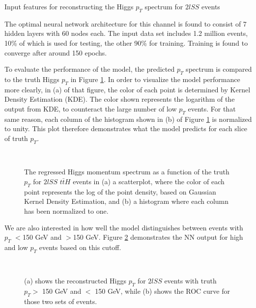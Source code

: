 \begin{table}[H]

  \caption{Input features for reconstructing the Higgs $p_T$ spectrum for $2lSS$ events}
  \label{tab:pt2lSSfeatures}
\end{table}

The optimal neural network architecture for this channel is found to consist of 7 hidden layers with 60 nodes each. The input data set includes 1.2 million events, 10\% of which is used for testing, the other 90\% for training. Training is found to converge after around 150 epochs. 

To evaluate the performance of the model, the predicted $p_T$ spectrum is compared to the truth Higgs $p_T$ in Figure \ref{fig:pt2lSSresults}. In  order to visualize the model performance more clearly, in (a) of that figure, the color of each point is determined by Kernel Density Estimation (KDE). The color shown represents the logarithm of the output from KDE, to counteract the large number of low $p_T$ events. For that same reason, each column of the histogram shown in (b) of Figure \ref{fig:pt2lSSresults} is normalized to unity. This plot therefore demonstrates what the model predicts for each slice of truth $p_T$.

\begin{figure}[H]
    \centering
    \\
    \caption{The regressed Higgs momentum spectrum as a function of the truth $p_T$ for $2lSS$ $t\bar{t}H$ events in (a) a scatterplot, where the color of each point represents the log of the point density, based on Gaussian Kernel Density Estimation, and (b) a histogram where each column  has been normalized to one.}
    \label{fig:pt2lSSresults}
\end{figure}

We are also interested in how well the model distinguishes between events with $p_T$ $<$150 GeV and $>$150 GeV. Figure \ref{fig:pt2lSSroc} demonstrates the NN output for high and low $p_T$ events based on this cutoff.

\begin{figure}[H]                                                                                                    
    \centering
    \\
    \caption{(a) shows the reconstructed Higgs $p_T$ for $2lSS$ events with truth $p_T > $ 150 GeV and $<$ 150 GeV, while (b) shows the ROC curve for those two sets of events.}
    \label{fig:pt2lSSroc}
\end{figure}
                                                                                                                            
